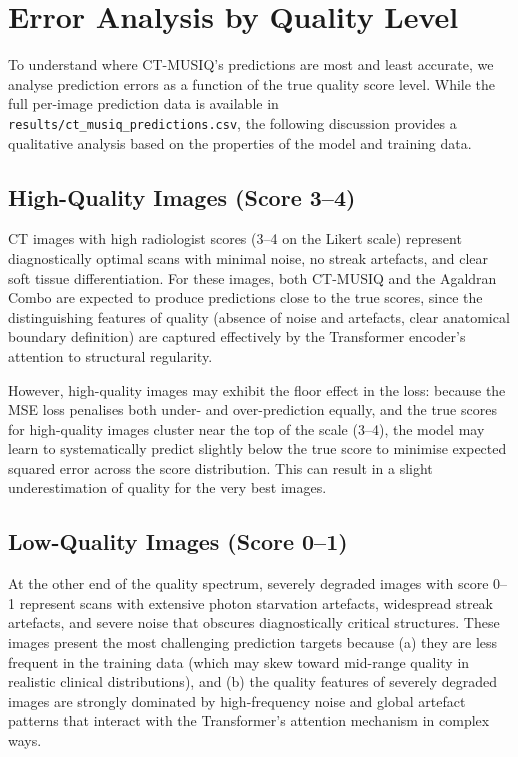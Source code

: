 \section{Error Analysis by Quality Level}
\label{sec:results_error_analysis}

To understand where CT-MUSIQ's predictions are most and least accurate, we analyse
prediction errors as a function of the true quality score level. While the full
per-image prediction data is available in \texttt{results/ct\_musiq\_predictions.csv},
the following discussion provides a qualitative analysis based on the properties of the
model and training data.

\subsection{High-Quality Images (Score 3--4)}

CT images with high radiologist scores (3--4 on the Likert scale) represent
diagnostically optimal scans with minimal noise, no streak artefacts, and clear soft
tissue differentiation. For these images, both CT-MUSIQ and the Agaldran Combo are
expected to produce predictions close to the true scores, since the distinguishing
features of quality (absence of noise and artefacts, clear anatomical boundary
definition) are captured effectively by the Transformer encoder's attention to structural
regularity.

However, high-quality images may exhibit the floor effect in the loss: because the MSE
loss penalises both under- and over-prediction equally, and the true scores for high-quality
images cluster near the top of the scale (3--4), the model may learn to systematically
predict slightly below the true score to minimise expected squared error across the
score distribution. This can result in a slight underestimation of quality for the very
best images.

\subsection{Low-Quality Images (Score 0--1)}

At the other end of the quality spectrum, severely degraded images with score 0--1
represent scans with extensive photon starvation artefacts, widespread streak artefacts,
and severe noise that obscures diagnostically critical structures. These images present
the most challenging prediction targets because (a) they are less frequent in the
training data (which may skew toward mid-range quality in realistic clinical distributions),
and (b) the quality features of severely degraded images are strongly dominated by
high-frequency noise and global artefact patterns that interact with the Transformer's
attention mechanism in complex ways.

